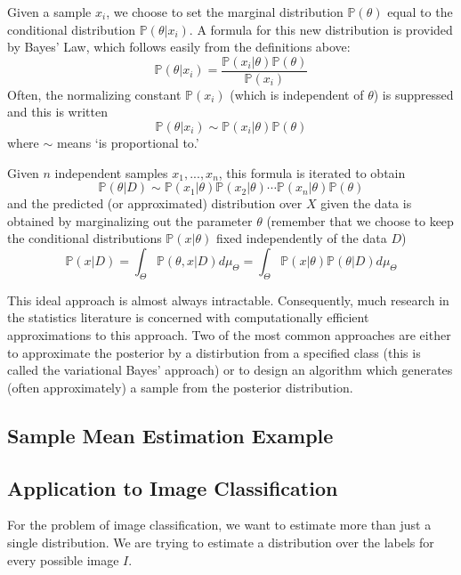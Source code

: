 Given a sample $x_i$, we choose to set the marginal distribution $\mathbb{P}(\theta)$ equal to the conditional distribution
$\mathbb{P}(\theta|x_i)$. A formula for this new distribution is provided by Bayes' Law, which
follows easily from the definitions above:
\begin{equation}\label{bayes_law}
  \mathbb{P}(\theta|x_i) = \frac{\mathbb{P}(x_i|\theta)\mathbb{P}(\theta)}{\mathbb{P}(x_i)}
\end{equation}
Often, the normalizing constant $\mathbb{P}(x_i)$ (which is independent of $\theta$) is suppressed and this is written
\begin{equation}
  \mathbb{P}(\theta|x_i) \sim \mathbb{P}(x_i|\theta)\mathbb{P}(\theta)
\end{equation}
where $\sim$ means `is proportional to.'

Given $n$ independent samples $x_1,...,x_n$, this formula is iterated to obtain
\begin{equation}
  \mathbb{P}(\theta|D) \sim \mathbb{P}(x_1|\theta)\mathbb{P}(x_2|\theta)\cdots\mathbb{P}(x_n|\theta)\mathbb{P}(\theta)
\end{equation}
and the predicted (or approximated) distribution over $X$ given the data is obtained by marginalizing out the 
parameter $\theta$ (remember that we choose to keep the conditional distributions $\mathbb{P}(x|\theta)$ fixed independently
of the data $D$)
\begin{equation}
  \mathbb{P}(x|D) = \int_{\Theta} \mathbb{P}(\theta,x|D)d\mu_\Theta = \int_{\Theta} \mathbb{P}(x|\theta)\mathbb{P}(\theta|D)d\mu_\Theta
\end{equation}

This ideal approach is almost always intractable. Consequently, much research in the statistics literature is concerned with
computationally efficient approximations to this approach. Two of the most common approaches are either to approximate
the posterior by a distirbution from a specified class (this is called the variational Bayes' approach) or to design an
algorithm which generates (often approximately) a sample from the posterior distribution.

\subsection{Sample Mean Estimation Example}
\subsection{Application to Image Classification}
For the problem of image classification, we want to estimate more than just a single distribution. We are trying to
estimate a distribution over the labels for every possible image $I$.

